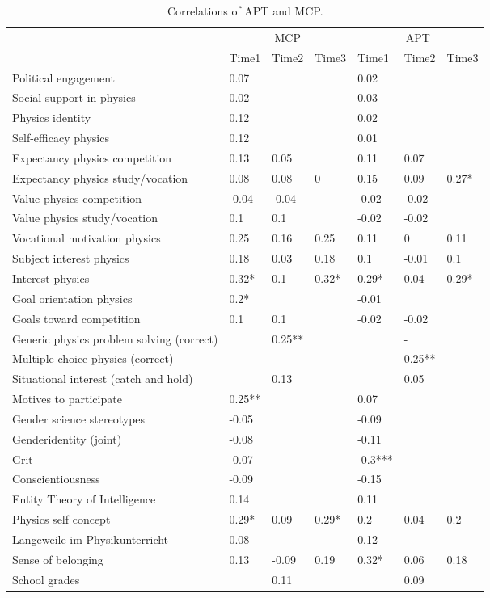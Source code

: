 \documentclass[C:/Users/sunpn505/Documents/studies/WinnerS/Erhebungen/IPhO1718/paper/problem_solving/main/main]{subfiles}
\begin{document}
\begin{table}
\caption{Correlations of APT and MCP.}
\label{APT_MCP_Corrs}
\begin{tabular}{lllllll}
\toprule
 & \multicolumn{3}{c}{MCP} & \multicolumn{3}{c}{APT} \\
 \cmidrule(lr){2-4} \cmidrule(lr){5-7}
 & Time1 & Time2 & Time3 & Time1 & Time2 & Time3 \\ 
  \midrule
Political engagement & 0.07 &  &  & 0.02 &  &  \\ 
  Social support in physics & 0.02 &  &  & 0.03 &  &  \\ 
  Physics identity & 0.12 &  &  & 0.02 &  &  \\ 
  Self-efficacy physics & 0.12 &  &  & 0.01 &  &  \\ 
  Expectancy physics competition & 0.13 & 0.05 &  & 0.11 & 0.07 &  \\ 
  Expectancy physics study/vocation & 0.08 & 0.08 & 0 & 0.15 & 0.09 & 0.27* \\ 
  Value physics competition & -0.04 & -0.04 &  & -0.02 & -0.02 &  \\ 
  Value physics study/vocation & 0.1 & 0.1 &  & -0.02 & -0.02 &  \\ 
  Vocational motivation physics & 0.25 & 0.16 & 0.25 & 0.11 & 0 & 0.11 \\ 
  Subject interest physics & 0.18 & 0.03 & 0.18 & 0.1 & -0.01 & 0.1 \\ 
  Interest physics & 0.32* & 0.1 & 0.32* & 0.29* & 0.04 & 0.29* \\ 
  Goal orientation physics & 0.2* &  &  & -0.01 &  &  \\ 
  Goals toward competition & 0.1 & 0.1 &  & -0.02 & -0.02 &  \\ 
  Generic physics problem solving (correct) &  & 0.25** &  &  & - &  \\ 
  Multiple choice physics (correct) &  & - &  &  & 0.25** &  \\ 
  Situational interest (catch and hold) &  & 0.13 &  &  & 0.05 &  \\ 
  Motives to participate & 0.25** &  &  & 0.07 &  &  \\ 
  Gender science stereotypes & -0.05 &  &  & -0.09 &  &  \\ 
  Genderidentity (joint) & -0.08 &  &  & -0.11 &  &  \\ 
  Grit & -0.07 &  &  & -0.3*** &  &  \\ 
  Conscientiousness & -0.09 &  &  & -0.15 &  &  \\ 
  Entity Theory of Intelligence & 0.14 &  &  & 0.11 &  &  \\ 
  Physics self concept & 0.29* & 0.09 & 0.29* & 0.2 & 0.04 & 0.2 \\ 
  Langeweile im Physikunterricht & 0.08 &  &  & 0.12 &  &  \\ 
  Sense of belonging & 0.13 & -0.09 & 0.19 & 0.32* & 0.06 & 0.18 \\ 
  School grades &  & 0.11 &  &  & 0.09 &  \\ 
   \bottomrule\end{tabular}
\end{table}
\end{document}
